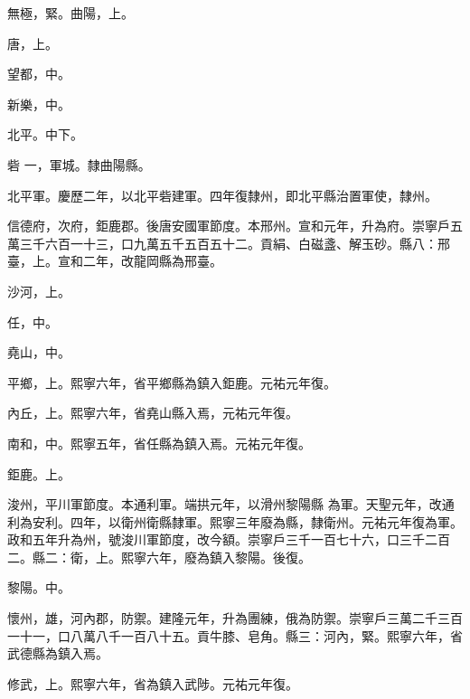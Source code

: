 \begin{pinyinscope}
 無極，緊。曲陽，上。



 唐，上。



 望都，中。



 新樂，中。



 北平。中下。



 砦
 一，軍城。隸曲陽縣。



 北平軍。慶歷二年，以北平砦建軍。四年復隸州，即北平縣治置軍使，隸州。



 信德府，次府，鉅鹿郡。後唐安國軍節度。本邢州。宣和元年，升為府。崇寧戶五萬三千六百一十三，口九萬五千五百五十二。貢絹、白磁盞、解玉砂。縣八：邢臺，上。宣和二年，改龍岡縣為邢臺。



 沙河，上。



 任，中。



 堯山，中。



 平鄉，上。熙寧六年，省平鄉縣為鎮入鉅鹿。元祐元年復。



 內丘，上。熙寧六年，省堯山縣入焉，元祐元年復。



 南和，中。熙寧五年，省任縣為鎮入焉。元祐元年復。



 鉅鹿。上。



 浚州，平川軍節度。本通利軍。端拱元年，以滑州黎陽縣
 為軍。天聖元年，改通利為安利。四年，以衛州衛縣隸軍。熙寧三年廢為縣，隸衛州。元祐元年復為軍。政和五年升為州，號浚川軍節度，改今額。崇寧戶三千一百七十六，口三千二百二。縣二：衛，上。熙寧六年，廢為鎮入黎陽。後復。



 黎陽。中。



 懷州，雄，河內郡，防禦。建隆元年，升為團練，俄為防禦。崇寧戶三萬二千三百一十一，口八萬八千一百八十五。貢牛膝、皂角。縣三：河內，緊。熙寧六年，省武德縣為鎮入焉。



 修武，上。熙寧六年，省為鎮入武陟。元祐元年復。




\end{pinyinscope}
